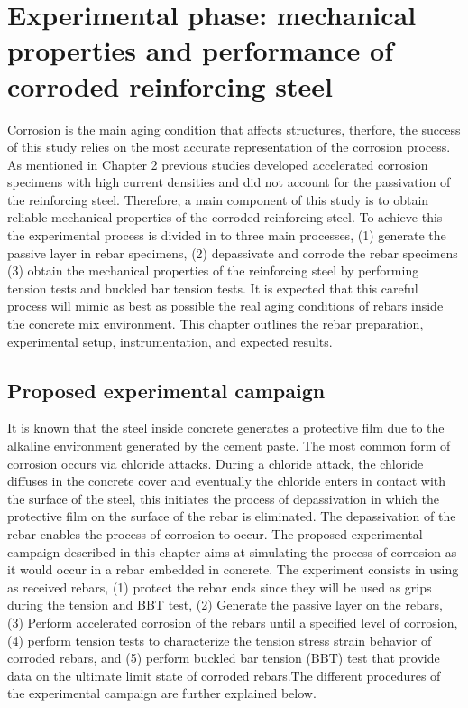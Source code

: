 \chapter{Experimental phase: mechanical properties and performance of corroded reinforcing steel}
\label{chap-three}

Corrosion is the main aging condition that affects structures, therfore, the success of this study relies on the most accurate representation of the corrosion process. As mentioned in Chapter 2 previous studies developed accelerated corrosion specimens with high current densities and did not account for the passivation of the reinforcing steel. Therefore, a main component of this study is to obtain reliable mechanical properties of the corroded reinforcing steel. To achieve this the experimental process is divided in to three main processes, (1) generate the passive layer in rebar specimens, (2) depassivate and corrode the rebar specimens (3) obtain the mechanical properties of the reinforcing steel by performing tension tests and buckled bar tension tests. It is expected that this careful process will mimic as best as possible the real aging conditions of rebars inside the concrete mix environment. This chapter outlines the rebar preparation, experimental setup, instrumentation, and expected results.

\section{Proposed experimental campaign}

It is known that the steel inside concrete generates a protective film due to the alkaline environment generated by the cement paste. The most common form of corrosion occurs via chloride attacks. During a chloride attack, the chloride diffuses in the concrete cover and eventually the chloride enters in contact with the surface of the steel, this initiates the process of depassivation in which the protective film on the surface of the rebar is eliminated. The depassivation of the rebar enables the process of corrosion to occur. The proposed experimental campaign described in this chapter aims at simulating the process of corrosion as it would occur in a rebar embedded in concrete. The experiment consists in using as received rebars, (1) protect the rebar ends since they will be used as grips during the tension and BBT test, (2)  Generate the passive layer on the rebars, (3) Perform accelerated corrosion  of the rebars until a specified level of corrosion, (4) perform tension tests to characterize the tension stress strain behavior of corroded rebars, and (5) perform buckled bar tension (BBT) test that provide data on the ultimate limit state of corroded rebars.The different procedures of the experimental campaign are further explained below.

